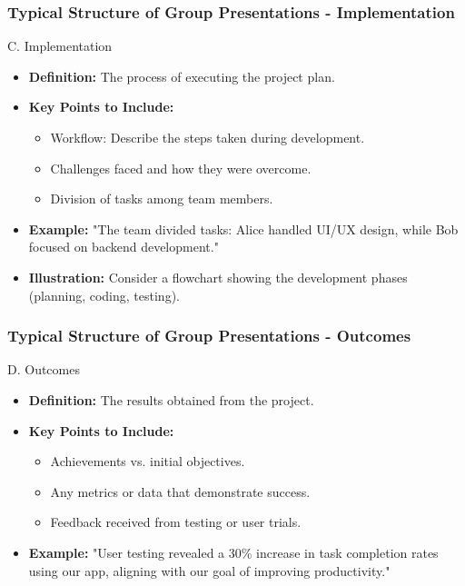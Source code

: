 \documentclass{beamer}
\begin{document}
\begin{frame}[fragile]
    \frametitle{Typical Structure of Group Presentations - Implementation}
    \begin{block}{C. Implementation}
        \begin{itemize}
            \item \textbf{Definition:} The process of executing the project plan.
            \item \textbf{Key Points to Include:}
                \begin{itemize}
                    \item Workflow: Describe the steps taken during development.
                    \item Challenges faced and how they were overcome.
                    \item Division of tasks among team members.
                \end{itemize}
            \item \textbf{Example:} "The team divided tasks: Alice handled UI/UX design, while Bob focused on backend development."
            \item \textbf{Illustration:} Consider a flowchart showing the development phases (planning, coding, testing).
        \end{itemize}
    \end{block}
\end{frame}

\begin{frame}[fragile]
    \frametitle{Typical Structure of Group Presentations - Outcomes}
    \begin{block}{D. Outcomes}
        \begin{itemize}
            \item \textbf{Definition:} The results obtained from the project.
            \item \textbf{Key Points to Include:}
                \begin{itemize}
                    \item Achievements vs. initial objectives.
                    \item Any metrics or data that demonstrate success.
                    \item Feedback received from testing or user trials.
                \end{itemize}
            \item \textbf{Example:} "User testing revealed a 30\% increase in task completion rates using our app, aligning with our goal of improving productivity."
        \end{itemize}
    \end{block}
\end{frame}
\end{document}
